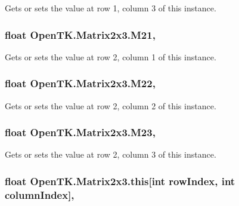 Gets or sets the value at row 1, column 3 of this instance. 

\hypertarget{struct_open_t_k_1_1_matrix2x3_a5cf6b1f3e091c3c7c421add7ba944983}{
\subsubsection[{M21}]{\setlength{\rightskip}{0pt plus 5cm}float Open\-T\-K.\-Matrix2x3.\-M21\hspace{0.3cm}{\ttfamily [get]}, {\ttfamily [set]}}}\label{struct_open_t_k_1_1_matrix2x3_a5cf6b1f3e091c3c7c421add7ba944983}


Gets or sets the value at row 2, column 1 of this instance. 

\hypertarget{struct_open_t_k_1_1_matrix2x3_a76b9c4f914ab97145bad10d29b63d9b5}{
\subsubsection[{M22}]{\setlength{\rightskip}{0pt plus 5cm}float Open\-T\-K.\-Matrix2x3.\-M22\hspace{0.3cm}{\ttfamily [get]}, {\ttfamily [set]}}}\label{struct_open_t_k_1_1_matrix2x3_a76b9c4f914ab97145bad10d29b63d9b5}


Gets or sets the value at row 2, column 2 of this instance. 

\hypertarget{struct_open_t_k_1_1_matrix2x3_a17381845696c10dbbff63cf673bf2f62}{
\subsubsection[{M23}]{\setlength{\rightskip}{0pt plus 5cm}float Open\-T\-K.\-Matrix2x3.\-M23\hspace{0.3cm}{\ttfamily [get]}, {\ttfamily [set]}}}\label{struct_open_t_k_1_1_matrix2x3_a17381845696c10dbbff63cf673bf2f62}


Gets or sets the value at row 2, column 3 of this instance. 

\hypertarget{struct_open_t_k_1_1_matrix2x3_ab8d936784b9df55d9ae961b7185637a3}{
\subsubsection[{this[int row\-Index, int column\-Index]}]{\setlength{\rightskip}{0pt plus 5cm}float Open\-T\-K.\-Matrix2x3.\-this\mbox{[}int row\-Index, int column\-Index\mbox{]}\hspace{0.3cm}{\ttfamily [get]}, {\ttfamily [set]}}}\label{struct_open_t_k_1_1_matrix2x3_ab8d936784b9df55d9ae961b7185637a3}


